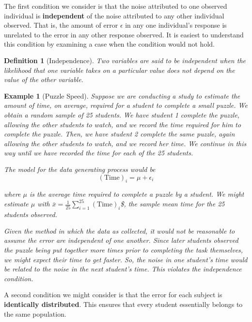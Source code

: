 \documentclass[
]{book}
\theoremstyle{plain}
\theoremstyle{mydefn}
\newtheorem{definition}{Definition}[chapter]
\theoremstyle{myexmpl}
\newtheorem{example}{Example}[chapter]
\theoremstyle{remark}
\begin{document}
The first condition we consider is that the noise attributed to one observed individual is \textbf{independent} of the noise attributed to any other individual observed. That is, the amount of error \(\epsilon\) in any one individual's response is unrelated to the error in any other response observed. It is easiest to understand this condition by examining a case when the condition would not hold.

\begin{definition}[Independence]
\protect\hypertarget{def:defn-independence}{}{\label{def:defn-independence} {} }Two variables are said to be independent when the likelihood that one variable takes on a particular value does not depend on the value of the other variable.\\
\end{definition}

\begin{example}[Puzzle Speed]
\protect\hypertarget{exm:ex-puzzles}{}{\label{exm:ex-puzzles} {} }Suppose we are conducting a study to estimate the amount of time, on average, required for a student to complete a small puzzle. We obtain a random sample of 25 students. We have student 1 complete the puzzle, allowing the other students to watch, and we record the time required for him to complete the puzzle. Then, we have student 2 complete the same puzzle, again allowing the other students to watch, and we record her time. We continue in this way until we have recorded the time for each of the 25 students.

The model for the data generating process would be
\[(\text{Time})_i = \mu + \epsilon_i\]

where \(\mu\) is the average time required to complete a puzzle by a student. We might estimate \(\mu\) with \(\bar{x} = \frac{1}{25}\sum_{i=1}^{25} (\text{Time})_i\)\$, the sample mean time for the 25 students observed.

Given the method in which the data as collected, it would \emph{not} be reasonable to assume the error are independent of one another. Since later students observed the puzzle being put together more times prior to completing the task themselves, we might expect their time to get faster. So, the noise in one student's time would be related to the noise in the next student's time. This violates the independence condition.
\end{example}

A second condition we might consider is that the error for each subject is \textbf{identically distributed}. This ensures that every student essentially belongs to the same population.
\end{document}

